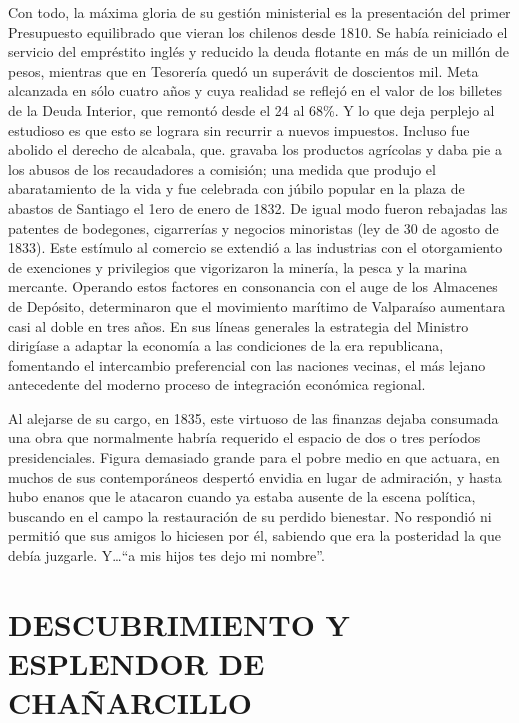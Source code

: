 \documentclass[10pt,twoside,openright]{memoir}
\begin{document}
Con todo, la máxima gloria de su gestión ministerial es la presentación
del primer Presupuesto equilibrado que vieran los chilenos desde 1810.
Se había reiniciado el servicio del empréstito inglés y reducido la
deuda flotante en más de un millón de pesos, mientras que en Tesorería
quedó un superávit de doscientos mil. Meta alcanzada en sólo cuatro años
y cuya realidad se reflejó en el valor de los billetes de la Deuda
Interior, que remontó desde el 24 al 68\%. Y lo que deja perplejo al
estudioso es que esto se lograra sin recurrir a nuevos impuestos.
Incluso fue abolido el derecho de alcabala, que. gravaba los productos
agrícolas y daba pie a los abusos de los recaudadores a comisión; una
medida que produjo el abaratamiento de la vida y fue celebrada con
júbilo popular en la plaza de abastos de Santiago el 1ero de enero de
1832. De igual modo fueron rebajadas las patentes de bodegones,
cigarrerías y negocios minoristas (ley de 30 de agosto de 1833). Este
estímulo al comercio se extendió a las industrias con el otorgamiento de
exenciones y privilegios que vigorizaron la minería, la pesca y la
marina mercante. Operando estos factores en consonancia con el auge de
los Almacenes de Depósito, determinaron que el movimiento marítimo de
Valparaíso aumentara casi al doble en tres años. En sus líneas generales
la estrategia del Ministro dirigíase a adaptar la economía a las
condiciones de la era republicana, fomentando el intercambio
preferencial con las naciones vecinas, el más lejano antecedente del
moderno proceso de integración económica regional.

Al alejarse de su cargo, en 1835, este virtuoso de las finanzas dejaba
consumada una obra que normalmente habría requerido el espacio de dos o
tres períodos presidenciales. Figura demasiado grande para el pobre
medio en que actuara, en muchos de sus contemporáneos despertó envidia
en lugar de admiración, y hasta hubo enanos que le atacaron cuando ya
estaba ausente de la escena política, buscando en el campo la
restauración de su perdido bienestar. No respondió ni permitió que sus
amigos lo hiciesen por él, sabiendo que era la posteridad la que debía
juzgarle. Y\ldots ``a mis hijos tes dejo mi nombre''.

\chapter{DESCUBRIMIENTO Y ESPLENDOR DE CHAÑARCILLO}
\end{document}
